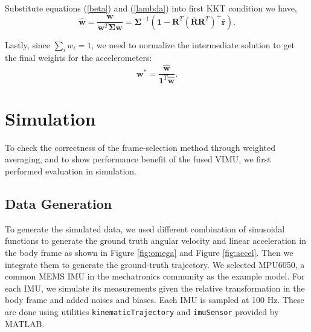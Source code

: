 \documentclass[conference]{IEEEtran}
\begin{document}
\noindent Substitute equations (\ref{beta}) and (\ref{lambda}) into first KKT condition we have,
\begin{equation}
    \hat{\textbf{w}} = \frac{\textbf{w}}{\textbf{w}^T\bm{\Sigma}\textbf{w}} = \bm{\Sigma}^{-1} \left( \textbf{1} - \textbf{R}^T \left(\bar{\textbf{R}}\textbf{R}^T\right)^{+} \bar{\textbf{r}} \right).
\end{equation}

\noindent Lastly, since $\sum_i{w_i} = 1$, we need to normalize the intermediate solution to get the final weights for the accelerometers:
\begin{equation}
    \textbf{w}^* = \frac{\hat{\textbf{w}}}{\textbf{1}^T \hat{\textbf{w}}}.
\end{equation}

\section{Simulation}

To check the correctness of the frame-selection method through weighted averaging, and to show performance benefit of the fused VIMU, we first performed evaluation in simulation.

\subsection{Data Generation}

To generate the simulated data, we used different combination of sinusoidal functions to generate the ground truth angular velocity and linear acceleration in the body frame as shown in Figure \ref{fig:omega} and Figure \ref{fig:accel}. Then we integrate them to generate the ground-truth trajectory. We selected MPU6050, a common MEMS IMU in the mechatronics community as the example model. For each IMU, we simulate its measurements given the relative transformation in the body frame and added noises and biases. Each IMU is sampled at 100 Hz. These are done using utilities \texttt{kinematicTrajectory} and \texttt{imuSensor} provided by MATLAB.
\end{document}

